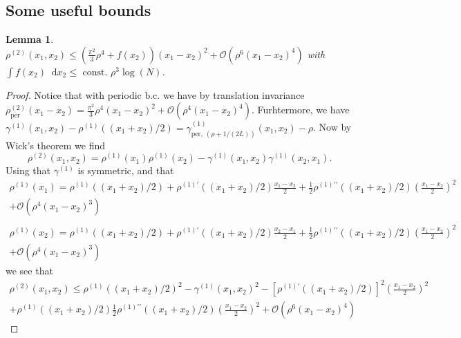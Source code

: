 \documentclass[a4paper,11pt]{article}
\newcommand*\diff{\mathop{}\!\mathrm{d}}
\newtheorem{lemma}{Lemma}
\numberwithin{equation}{section}
\begin{document}
	\subsection{Some useful bounds}
	\begin{lemma}\label{Lemma rho2 bound}
		$ \rho^{(2)}(x_1,x_2)\leq\left(\frac{\pi^2}{3}\rho^4+f(x_2)\right)(x_1-x_2)^2+\mathcal{O}(\rho^6(x_1-x_2)^4) $ with $ \int f(x_2)\diff x_2\leq \text{ const. }\rho^3\log(N) $.
		\end{lemma}
		\begin{proof}
			Notice that with periodic b.c. we have by translation invariance $ \rho^{(2)}_{\text{per}}(x_1-x_2)=\frac{\pi^2}{3}\rho^4(x_1-x_2)^2+\mathcal{O}(\rho^4(x_1-x_2)^4) $. Furhtermore, we have $ \gamma^{(1)}(x_1,x_2)-\rho^{(1)}\left((x_1+x_2)/2\right)=\gamma_{\text{per},\ (\rho+1/(2L))}^{(1)}(x_1,x_2)-\rho $. Now by Wick's theorem we find \begin{equation}
			\rho^{(2)}(x_1,x_2)=\rho^{(1)}(x_1)\rho^{(1)}(x_2)-\gamma^{(1)}(x_1,x_2)\gamma^{(1)}(x_2,x_1).
			\end{equation}
			Using that $ \gamma^{(1)} $ is symmetric, and that \begin{equation}
			\begin{aligned}
			\rho^{(1)}(x_1)=\rho^{(1)}((x_1+x_2)/2)+\rho^{(1)\prime}((x_1+x_2)/2)\frac{x_1-x_2}{2}+\frac{1}{2}\rho^{(1)\prime\prime}((x_1+x_2)/2)\left(\frac{x_1-x_2}{2}\right)^2\\+\mathcal{O}(\rho^4(x_1-x_2)^3)\\
			\end{aligned}
			\end{equation}
			\begin{equation}
			\begin{aligned}
			\rho^{(1)}(x_2)=\rho^{(1)}((x_1+x_2)/2)+\rho^{(1)\prime}((x_1+x_2)/2)\frac{x_2-x_1}{2}+\frac{1}{2}\rho^{(1)\prime\prime}((x_1+x_2)/2)\left(\frac{x_1-x_2}{2}\right)^2\\+\mathcal{O}(\rho^4(x_1-x_2)^3)
			\end{aligned}
			\end{equation}
			we see that \begin{equation}
			\begin{aligned}
			\rho^{(2)}(x_1,x_2)\leq\rho^{(1)}((x_1+x_2)/2)^2-\gamma^{(1)}(x_1,x_2)^2-\left[\rho^{(1)\prime}((x_1+x_2)/2)\right]^2\left(\frac{x_1-x_2}{2}\right)^2\\+\rho^{(1)}((x_1+x_2)/2)\frac{1}{2}\rho^{(1)\prime\prime}((x_1+x_2)/2)\left(\frac{x_1-x_2}{2}\right)^2+\mathcal{O}(\rho^6(x_1-x_2)^4)

\end{aligned}
\end{equation}
\end{proof}
\end{document}
